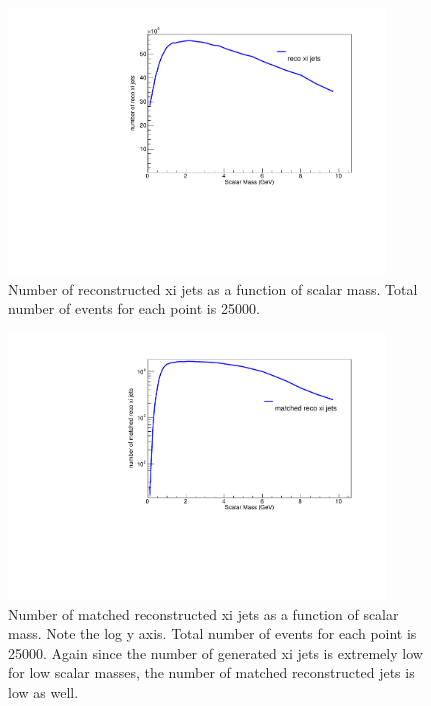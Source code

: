 \documentclass[aps,onecolumn,twoside,secnumarabic,balancelastpage,amsmath,amssymb,nofootinbib,hyperref=pdftex]{revtex4}
\begin{document}
\begin{figure}[t]
\begin{center}
\includegraphics[width=10cm]{reco_xi_jets.pdf}

\caption{Number of reconstructed xi jets as a function of scalar mass. Total number of events for each point is 25000.}
\label{default}
\end{center}
\end{figure}

\begin{figure}[t]
\begin{center}
\includegraphics[width=10cm]{matched_reco_xi_jets.pdf}

\caption{Number of matched reconstructed xi jets as a function of scalar mass. Note the log y axis. Total number of events for each point is 25000. Again since the number of generated xi jets is extremely low for low scalar masses, the number of matched reconstructed jets is low as well.}
\label{default}
\end{center}
\end{figure}
\end{document}

